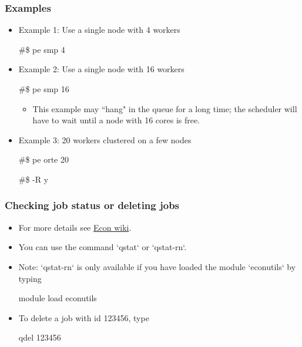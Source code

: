\documentclass{beamer}
\begin{document}
\begin{frame}[fragile]
\frametitle{Examples}
\begin{itemize}
\item Example 1: Use a single node with 4 workers
\begin{semiverbatim}
\#\$ pe smp 4
\end{semiverbatim}
\item Example 2: Use a single node with 16 workers
\begin{semiverbatim}
\#\$ pe smp 16
\end{semiverbatim}
\begin{itemize}
\item This example may ``hang" in the queue for a long time; the scheduler will have to wait until a node with 16 cores is free.
\end{itemize}
\item Example 3: 20 workers clustered on a few nodes
\begin{semiverbatim}
\#\$ pe orte 20
\end{semiverbatim}
\vspace{-0.4cm}
\begin{semiverbatim}
\#\$ -R y 
\end{semiverbatim}
\end{itemize}
\end{frame}

\begin{frame}
\frametitle{Checking job status or deleting jobs}

\begin{itemize}
\item For more details see \textcolor{blue}{\href{https://www.econ.ucl.ac.uk/wiki/index.php/Checking_the_status_of_your_jobs}{Econ wiki}}.
\item You can use the command `qstat` or `qstat-rn`.
\item Note: `qstat-rn` is only available if you have loaded the module `econutils` by typing
\begin{semiverbatim}
module load econutils
\end{semiverbatim}
\item To delete a job with id 123456, type
\begin{semiverbatim}
qdel 123456
\end{semiverbatim}
\end{itemize}
\end{frame}
\end{document}
